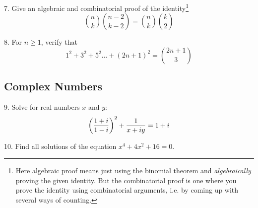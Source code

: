 \documentclass{article}
\begin{document}
\noindent
\vspace{2.5mm}

7. Give an algebraic and combinatorial proof of the identity\footnote{Here algebraic proof means just using the binomial theorem and \textit{algebraically} proving the given identity. But the combinatorial proof is one where you prove the identity using combinatorial arguments, i.e. by coming up with several ways of counting.} 
\[ \binom{n}{k} \binom{n-2}{k-2} = \binom{n}{k} \binom{k}{2} \]

\noindent
\vspace{2.5mm}

8. For $n \geq 1$, verify that
\[ 1^{2} + 3^{2} + 5^{2} \dots + (2n+1)^{2} = \binom{2n+1}{3} \]

\subsection{Complex Numbers}
\noindent
\vspace{2.5mm}

9. Solve for real numbers $x$ and $y$:
\[ \qty(\frac{1+i}{1-i})^{2} + \frac{1}{x+iy} = 1+i \]

\noindent
\vspace{2.5mm}

10. Find all solutions of the equation $x^{4}+4x^{2}+16=0$.
\end{document}
